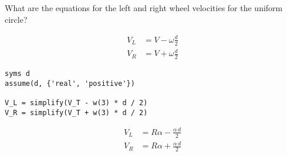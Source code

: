 What are the equations for the left and right wheel velocities for the uniform circle?

\begin{solution}
\begin{align*}
    V_L &= V - \omega\frac{d}{2} \\
    V_R &= V + \omega\frac{d}{2}
\end{align*}

\begin{lstlisting}
syms d
assume(d, {'real', 'positive'})

V_L = simplify(V_T - w(3) * d / 2)
V_R = simplify(V_T + w(3) * d / 2)
\end{lstlisting}

\begin{align*}
    V_L &= R \alpha-\frac{\alpha \,d}{2} \\
    V_R &= R \alpha+\frac{\alpha \,d}{2}
\end{align*}
\end{solution}